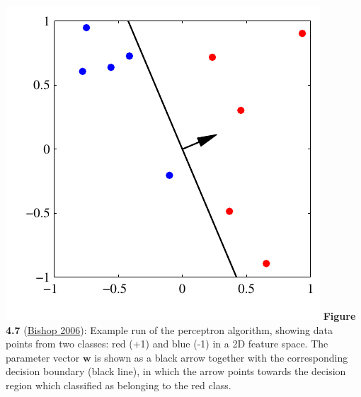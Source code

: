 \documentclass[ignorenonframetext,plain,fleqn]{beamer}
\renewcommand{\vec}{\mathbf}
\begin{document}
\begin{frame}
\begin{columns}
\includegraphics[height=.4\textheight]{images/bishop-fig-4-7d.pdf}
\footnotesize {\bf Figure 4.7}
(\href{http://research.microsoft.com/en-us/um/people/cmbishop/prml}{Bishop
  2006}): Example run of the perceptron algorithm, showing data points
from two classes: red (+1) and blue (-1) in a 2D feature space. The
parameter vector $\vec{w}$ is shown as a black arrow together with the
corresponding decision boundary (black line), in which the arrow
points towards the decision region which classified as belonging to
the red class.
\end{columns}
\end{frame}
\end{document}

